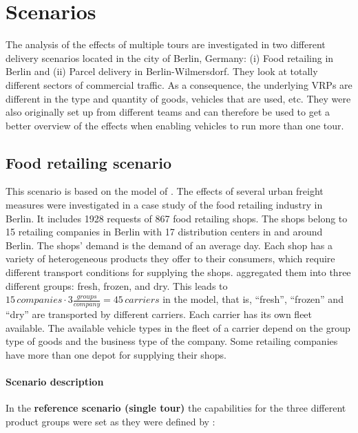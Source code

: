 \section{Scenarios}
\label{sec:el-shipments-scenarios}
The analysis of the effects of multiple tours are investigated in two different delivery scenarios located in the city of Berlin, Germany: (i) Food retailing in Berlin and (ii) Parcel delivery in Berlin-Wilmersdorf. They look at totally different sectors of commercial traffic. As a consequence, the underlying VRPs are different in the type and quantity of goods, vehicles that are used, etc. They were also originally set up from different teams and can therefore be used to get a better overview of the effects when enabling vehicles to run more than one tour.

\subsection{Food retailing scenario}
\label{sec:el-shipments-sceanrios-food} 
This scenario is based on the model of \citet{SchroederLiedtke2014FoodDistributionBerlin}. The effects of several urban freight measures were investigated in a case study of the food retailing industry in Berlin. It includes 1928 requests of 867 food retailing shops. The shops belong to 15 retailing companies in Berlin with 17 distribution centers in and around Berlin.
The shops' demand is the demand of an average day. Each shop has a variety of heterogeneous products they offer to their consumers, which require different transport conditions for supplying the shops. \citet{SchroederLiedtke2014FoodDistributionBerlin}  aggregated them into three different groups: fresh, frozen, and dry. 
This leads to $15 \, {\textit{companies}} \cdot 3 \frac{\textit{groups}}{\textit{company}} = 45 \, {\textit{carriers}}$ in the model, that is, ``fresh'', ``frozen'' and ``dry'' are transported by different carriers. Each carrier has its own fleet available. The available vehicle types in the fleet of a carrier depend on the group type of goods and the business type of the company. Some retailing companies have more than one depot for supplying their shops.

\paragraph*{Scenario description}
In the \textbf{reference scenario (single tour)} the capabilities for the three different product groups were set as they were defined by \citet{SchroederLiedtke2014FoodDistributionBerlin}:

